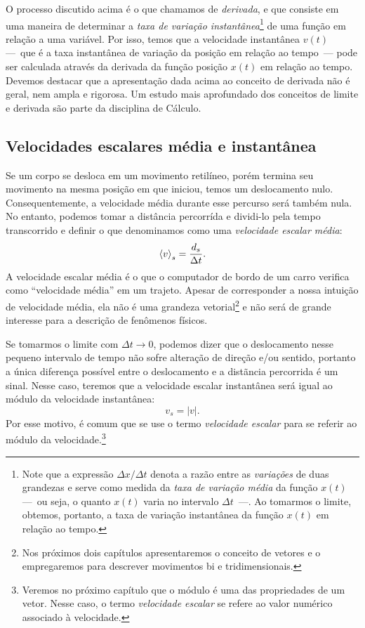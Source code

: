 O processo discutido acima é o que chamamos de \emph{derivada}, e que consiste em uma maneira de determinar a \emph{taxa de variação instantânea}\footnote{Note que a expressão $\Delta x/\Delta t$ denota a razão entre as \emph{variações} de duas grandezas e serve como medida da \emph{taxa de variação média} da função $x(t)$ ---~ou seja, o quanto $x(t)$ varia no intervalo $\Delta t$~---. Ao tomarmos o limite, obtemos, portanto, a taxa de variação instantânea da função $x(t)$ em relação ao tempo.} de uma função em relação a uma variável. Por isso, temos que a velocidade instantânea $v(t)$ ---~que é a taxa instantânea de variação da posição em relação ao tempo~--- pode ser calculada através da derivada da função posição $x(t)$ em relação ao tempo. Devemos destacar que a apresentação dada acima ao conceito de derivada não é geral, nem ampla e rigorosa. Um estudo mais aprofundado dos conceitos de limite e derivada são parte da disciplina de Cálculo.

\subsection{Velocidades escalares média e instantânea}

Se um corpo se desloca em um movimento retilíneo, porém termina seu movimento na mesma posição em que iniciou, temos um deslocamento nulo. Consequentemente, a velocidade média durante esse percurso será também nula. No entanto, podemos tomar a distância percorrída e dividi-lo pela tempo transcorrido e definir o que denominamos como uma \emph{velocidade escalar média}:
\begin{equation}
  \left\langle{v}\right\rangle_s = \frac{d_s}{\Delta t}.
\end{equation}
%
A velocidade escalar média é o que o computador de bordo de um carro verifica como ``velocidade média'' em um trajeto. Apesar de corresponder a nossa intuição de velocidade média, ela não é uma grandeza vetorial\footnote{Nos próximos dois capítulos apresentaremos o conceito de vetores e o empregaremos para descrever movimentos bi e tridimensionais.} e não será de grande interesse para a descrição de fenômenos físicos.

Se tomarmos o limite com $\Delta t \to 0$, podemos dizer que o deslocamento nesse pequeno intervalo de tempo não sofre alteração de direção e/ou sentido, portanto a única diferença possível entre o deslocamento e a distãncia percorrida é um sinal. Nesse caso, teremos que a velocidade escalar instantânea será igual ao módulo da velocidade instantânea:
\begin{equation}
  v_s = |v|.
\end{equation}
%
Por esse motivo, é comum que se use o termo \emph{velocidade escalar} para se referir ao módulo da velocidade.\footnote{Veremos no próximo capítulo que o módulo é uma das propriedades de um vetor. Nesse caso, o termo \emph{velocidade escalar} se refere ao valor numérico associado à velocidade.}

